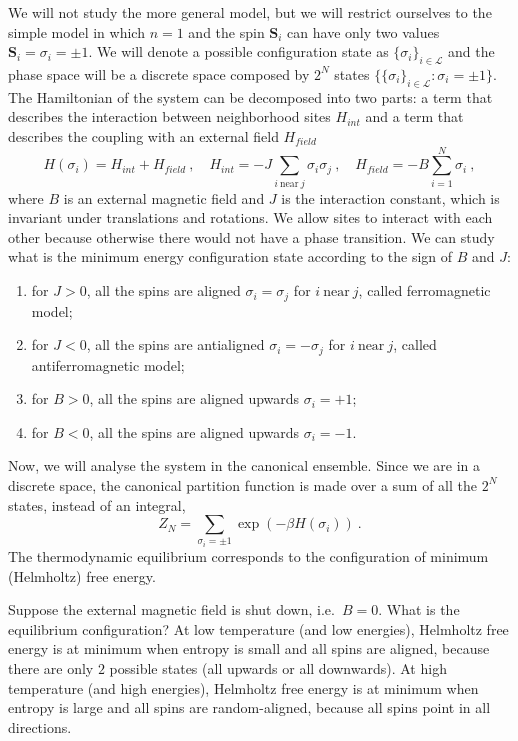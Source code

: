     We will not study the more general model, but we will restrict ourselves to the simple model in which $n = 1$ and the spin $\mathbf S_i$ can have only two values $\mathbf S_i = \sigma_i = \pm 1$. We will denote a possible configuration state as $\{\sigma_i\}_{i \in \mathcal L}$ and the phase space will be a discrete space composed by $2^N$ states $\{\{\sigma_i\}_{i \in \mathcal L} \colon \sigma_i = \pm 1\}$. The Hamiltonian of the system can be decomposed into two parts: a term that describes the interaction between neighborhood sites $H_{int}$ and a term that describes the coupling with an external field $H_{field}$ 
    \begin{equation*}
        H(\sigma_i) = H_{int} + H_{field} ~, \quad H_{int} = - J \sum_{i~\text{near}~j} \sigma_i \sigma_j ~, \quad H_{field} = - B \sum_{i=1}^{N} \sigma_i ~,
    \end{equation*}
    where $B$ is an external magnetic field and $J$ is the interaction constant, which is invariant under translations and rotations. We allow  sites to interact with each other because otherwise there would not have a phase transition.
    We can study what is the minimum energy configuration state according to the sign of $B$ and $J$:
    \begin{enumerate}
        \item for $J > 0$, all the spins are aligned $\sigma_i = \sigma_j$ for $i~\text{near}~j$, called ferromagnetic model;
        \item for $J < 0$, all the spins are antialigned $\sigma_i = - \sigma_j$ for $i~\text{near}~j$, called antiferromagnetic model;
        \item for $B > 0$, all the spins are aligned upwards $\sigma_i = + 1$;
        \item for $B < 0$, all the spins are aligned upwards $\sigma_i = - 1$. 
    \end{enumerate}
    Now, we will analyse the system in the canonical ensemble. Since we are in a discrete space, the canonical partition function is made over a sum of all the $2^N$ states, instead of an integral,
    \begin{equation*}
        Z_N = \sum_{\sigma_i = \pm 1} \exp(- \beta H(\sigma_i)) ~.
    \end{equation*}
    The thermodynamic equilibrium corresponds to the configuration of minimum (Helmholtz) free energy.

    Suppose the external magnetic field is shut down, i.e.~$B = 0$. What is the equilibrium configuration? At low temperature (and low energies), Helmholtz free energy is at minimum when entropy is small and all spins are aligned, because there are only $2$ possible states (all upwards or all downwards). At high temperature (and high energies), Helmholtz free energy is at minimum when entropy is large and all spins are random-aligned, because all spins point in all directions. 
    
